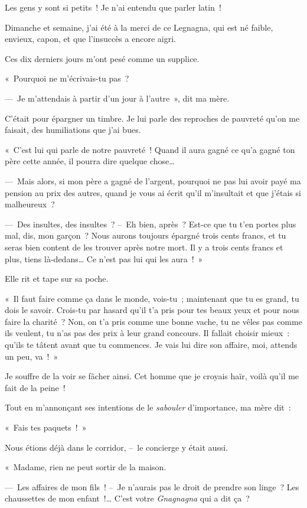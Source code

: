 \documentclass[french,twoside]{book} %
\begin{document}
Les gens y sont si petits ! Je n’ai entendu que parler latin !\par
Dimanche et semaine, j’ai été à la merci de ce Legnagna, qui est né faible, envieux, capon, et que l’insuccès a encore aigri.\par
Ces dix derniers jours m’ont pesé comme un supplice.\par
\bigbreak
\noindent « Pourquoi ne m’écrivais-tu pas ?\par
— Je m’attendais à partir d’un jour à l’autre », dit ma mère.\par
C’était pour épargner un timbre. Je lui parle des reproches de pauvreté qu’on me faisait, des humiliations que j’ai bues.\par
« C’est lui qui parle de notre pauvreté ! Quand il aura gagné ce qu’a gagné ton père cette année, il pourra dire quelque chose…\par
— Mais alors, si mon père a gagné de l’argent, pourquoi ne pas lui avoir payé ma pension au prix des autres, quand je vous ai écrit qu’il m’insultait et que j’étais si malheureux ?\par
— Des insultes, des insultes ? – Eh bien, après ? Est-ce que tu t’en portes plus mal, dis, mon garçon ? Nous aurons toujours épargné trois cents francs, et tu seras bien content de les trouver après notre mort. Il y a trois cents francs et plus, tiens là-dedans… Ce n’est pas lui qui les aura ! »\par
Elle rit et tape sur sa poche.\par
« Il faut faire comme ça dans le monde, vois-tu ; maintenant que tu es grand, tu dois le savoir. Crois-tu par hasard qu’il t’a pris pour tes beaux yeux et pour nous faire la charité ? Non, on t’a pris comme une bonne vache, tu ne vêles pas comme ils veulent, tu n’as pas des prix à leur grand concours. Il fallait choisir mieux : qu’ils te tâtent avant que tu commences. Je vais lui dire son affaire, moi, attends un peu, va ! »\par
\bigbreak
\noindent Je souffre de la voir se fâcher ainsi. Cet homme que je croyais haïr, voilà qu’il me fait de la peine !\par
Tout en m’annonçant ses intentions de le \emph{sabouler} d’importance, ma mère dit :\par
« Fais tes paquets ! »\par
Nous étions déjà dans le corridor, – le concierge y était aussi.\par
« Madame, rien ne peut sortir de la maison.\par
— Les affaires de mon fils ! – Je n’aurais pas le droit de prendre son linge ? Les chaussettes de mon enfant !… C’est votre \emph{Gnagnagna} qui a dit ça ?\par
\end{document}
